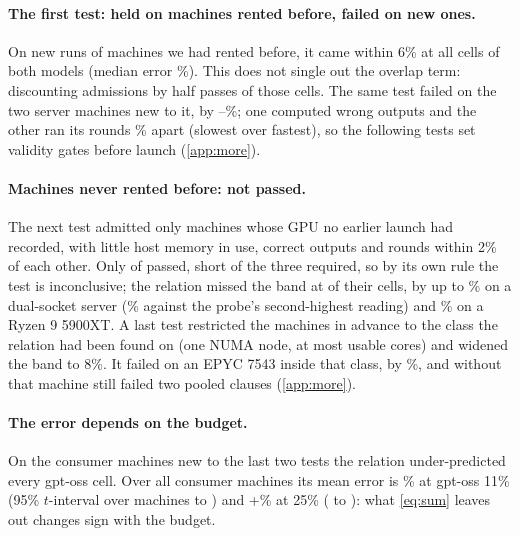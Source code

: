 

\paragraph{The first test: held on machines rented before, failed on new ones.} On new runs of \jiStable{} machines we had rented before, it came within 6\% at
all \jiCells{} cells of both models (median error \jiErrMed\%). This does not single out the overlap term: discounting
admissions by half passes \jiAltHalf{} of those cells. The same test failed on the two server machines new to it, by
\jiUnstErrMin--\jiUnstErrMax\%; one computed wrong outputs and the other ran its rounds \jiUnstableSpreadMax\% apart (slowest over fastest), so
the following tests set validity gates before launch (\cref{app:more}).

\paragraph{Machines never rented before: not passed.} The next test admitted only machines whose GPU no earlier launch
had recorded, with little host memory in use, correct outputs and rounds within 2\% of each other. Only \jlValidWord{}
of \jlLaunched{} passed, short of the three required, so by its own rule the test is inconclusive; the relation missed the
band at \jlFailCells{} of their \jlCells{} cells, by up to \jlNewServErrMax\% on a dual-socket server
(\rbServSecondMax\% against the probe's second-highest reading) and \jlNewDeskErrMax\% on a Ryzen 9 5900XT. A last test
restricted the machines in advance to the class the relation had been found on (one NUMA node, at most \jlClassCores{}
usable cores) and widened the band to 8\%. It failed on an EPYC 7543 inside that class, by \jmErraLow\%, and without
that machine still failed two pooled clauses (\cref{app:more}).

\paragraph{The error depends on the budget.} On the \jmNewConsWord{} consumer machines new to the last two tests the
relation under-predicted every gpt-oss cell. Over all \rbErrMachines{} consumer machines its mean error is \rbErrMean\%
at gpt-oss 11\% (95\% $t$-interval over machines \rbErrLo{} to \rbErrHi) and +\rbErrMidMean\% at 25\% (\rbErrMidLo{} to
\rbErrMidHi): what \cref{eq:sum} leaves out changes sign with the budget.

